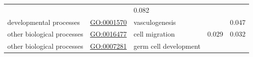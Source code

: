 \documentclass[
]{article}
\begin{document}
\begin{longtable}[]{@{}lllll@{}}
\begin{minipage}[t]{0.17\columnwidth}
\end{minipage} & \begin{minipage}[t]{0.17\columnwidth}\raggedright
\strut
\end{minipage} & \begin{minipage}[t]{0.17\columnwidth}\raggedright
0.082\strut
\end{minipage}\tabularnewline
\begin{minipage}[t]{0.17\columnwidth}\raggedright
developmental processes\strut
\end{minipage} & \begin{minipage}[t]{0.17\columnwidth}\raggedright
\url{GO:0001570}\strut
\end{minipage} & \begin{minipage}[t]{0.17\columnwidth}\raggedright
vasculogenesis\strut
\end{minipage} & \begin{minipage}[t]{0.17\columnwidth}\raggedright
\strut
\end{minipage} & \begin{minipage}[t]{0.17\columnwidth}\raggedright
0.047\strut
\end{minipage}\tabularnewline
\begin{minipage}[t]{0.17\columnwidth}\raggedright
other biological processes\strut
\end{minipage} & \begin{minipage}[t]{0.17\columnwidth}\raggedright
\url{GO:0016477}\strut
\end{minipage} & \begin{minipage}[t]{0.17\columnwidth}\raggedright
cell migration\strut
\end{minipage} & \begin{minipage}[t]{0.17\columnwidth}\raggedright
0.029\strut
\end{minipage} & \begin{minipage}[t]{0.17\columnwidth}\raggedright
0.032\strut
\end{minipage}\tabularnewline
\begin{minipage}[t]{0.17\columnwidth}\raggedright
other biological processes\strut
\end{minipage} & \begin{minipage}[t]{0.17\columnwidth}\raggedright
\url{GO:0007281}\strut
\end{minipage} & \begin{minipage}[t]{0.17\columnwidth}\raggedright
germ cell development\strut
\end{minipage} & \begin{minipage}[t]{0.17\columnwidth}\raggedright

\end{minipage}
\end{longtable}
\end{document}
